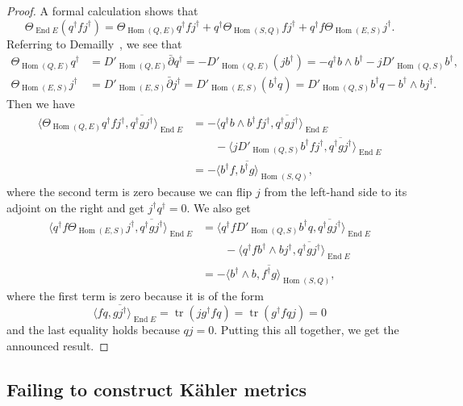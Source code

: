 \documentclass[10pt,a4paper]{article}
\newtheorem*{proof}{Proof}
\def\ov#1{\overline{#1}}
\DeclareMathOperator{\End}{End}
\DeclareMathOperator{\Hom}{Hom}
\DeclareMathOperator{\tr}{tr}
\begin{document}
\begin{proof}
A formal calculation shows that
\[
\Theta_{\End E} (q^\dagger f j^\dagger)
= \Theta_{\Hom(Q,E)} q^\dagger f j^\dagger
+ q^\dagger \Theta_{\Hom(S,Q)} f j^\dagger
+ q^\dagger f \Theta_{\Hom(E,S)} j^\dagger.
\]
Referring to Demailly~\cite[Theorem~14.3]{demailly-complex}, we see that
\begin{align*}
\Theta_{\Hom(Q,E)} q^\dagger
&= D'_{\Hom(Q,E)} \bar\partial q^\dagger
= -D'_{\Hom(Q,E)} (j b^\dagger)
= -q^\dagger b \wedge b^\dagger - j D'_{\Hom(Q,S)}b^\dagger,
\\
\Theta_{\Hom(E,S)} j^\dagger
&= D'_{\Hom(E,S)} \bar\partial j^\dagger
= D'_{\Hom(E,S)}(b^\dagger q)
= D'_{\Hom(Q,S)}b^\dagger q - b^\dagger \wedge b j^\dagger.
\end{align*}
Then we have
\begin{align*}
\langle \Theta_{\Hom(Q,E)} q^\dagger f j^\dagger, \ov{q^\dagger g j^\dagger} \rangle_{\End E}
&= -\langle q^\dagger b \wedge b^\dagger f j^\dagger, \ov{q^\dagger g j^\dagger} \rangle_{\End E}
\\
&\qquad - \langle j D'_{\Hom(Q,S)}b^\dagger f j^\dagger, \ov{q^\dagger g j^\dagger} \rangle_{\End E}
\\
&= -\langle b^\dagger f, \ov{b^\dagger g} \rangle_{\Hom(S,Q)},
\end{align*}
where the second term is zero because we can flip $j$ from the left-hand side to its adjoint on the right and get $j^\dagger q^\dagger = 0$. We also get
\begin{align*}
\langle q^\dagger f \Theta_{\Hom(E,S)} j^\dagger, \ov{q^\dagger g j^\dagger} \rangle_{\End E}
&= \langle q^\dagger f D'_{\Hom(Q,S)}b^\dagger q , \ov{q^\dagger g j^\dagger} \rangle_{\End E}
\\
&\qquad
- \langle q^\dagger f b^\dagger \wedge b j^\dagger, \ov{q^\dagger g j^\dagger} \rangle_{\End E}
\\
&= - \langle b^\dagger \wedge b, \ov{f^\dagger g} \rangle_{\Hom(S,Q)},
\end{align*}
where the first term is zero because it is of the form
\[
\langle f q, \ov{g j^\dagger} \rangle_{\End E}
= \tr(j g^\dagger f q)
= \tr(g^\dagger f q j) = 0
\]
and the last equality holds because $q j = 0$.
Putting this all together, we get the announced result.
\end{proof}



\subsection{Failing to construct K\"ahler metrics}
\end{document}
